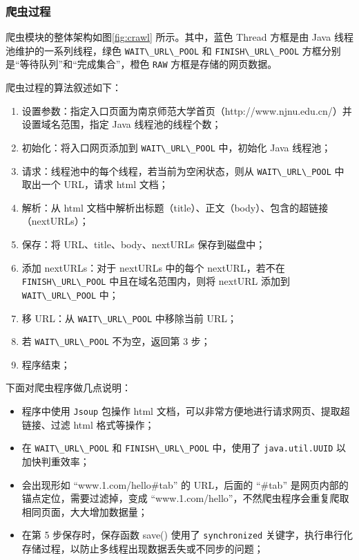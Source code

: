 \documentclass{ctexart}
\newcommand{\code}[1]{\colorbox{backcolor}{\lstinline|#1|}}
\begin{document}
    \subsubsection{爬虫过程}\label{subsubsec:crawl_run}

    爬虫模块的整体架构如图\ref{fig:crawl} 所示。其中，蓝色 Thread 方框是由 Java 线程池维护的一系列线程，绿色 \code{WAIT\_URL\_POOL} 和 \code{FINISH\_URL\_POOL} 方框分别是“等待队列”和“完成集合”，橙色 \code{RAW} 方框是存储的网页数据。

    爬虫过程的算法叙述如下：

    \begin{enumerate}
        \item 设置参数：指定入口页面为南京师范大学首页（http://www.njnu.edu.cn/）并设置域名范围，指定 Java 线程池的线程个数；
        \item 初始化：将入口网页添加到 \code{WAIT\_URL\_POOL} 中，初始化 Java 线程池；
        \item 请求：线程池中的每个线程，若当前为空闲状态，则从 \code{WAIT\_URL\_POOL} 中取出一个 URL，请求 html 文档；
        \item 解析：从 html 文档中解析出标题（title）、正文（body）、包含的超链接（nextURLs）；
        \item 保存：将 URL、title、body、nextURLs 保存到磁盘中；
        \item 添加 nextURLs：对于 nextURLs 中的每个 nextURL，若不在 \code{FINISH\_URL\_POOL} 中且在域名范围内，则将 nextURL 添加到 \code{WAIT\_URL\_POOL} 中；
        \item 移 URL：从 \code{WAIT\_URL\_POOL} 中移除当前 URL；
        \item 若 \code{WAIT\_URL\_POOL} 不为空，返回第 3 步；
        \item 程序结束；
    \end{enumerate}

    下面对爬虫程序做几点说明：

    \begin{itemize}
        \item 程序中使用 \code{Jsoup} 包操作 html 文档，可以非常方便地进行请求网页、提取超链接、过滤 html 格式等操作；
        \item 在 \code{WAIT\_URL\_POOL} 和 \code{FINISH\_URL\_POOL} 中，使用了 \code{java.util.UUID} 以加快判重效率；
        \item 会出现形如 “www.1.com/hello\#tab” 的 URL，后面的 “\#tab” 是网页内部的锚点定位，需要过滤掉，变成 “www.1.com/hello”，不然爬虫程序会重复爬取相同页面，大大增加数据量；
        \item 在第 5 步保存时，保存函数 save() 使用了 \code{synchronized} 关键字，执行串行化存储过程，以防止多线程出现数据丢失或不同步的问题；
    \end{itemize}
\end{document}
